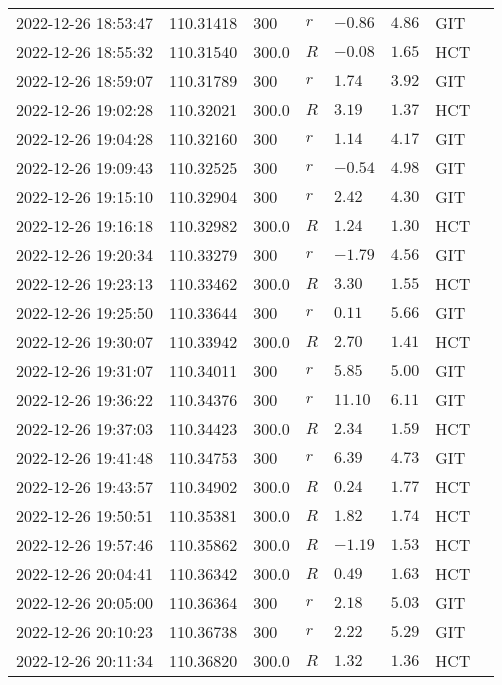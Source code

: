 \documentclass{nature_plusfigure}
\begin{document}
\begin{supplement}
\begin{center}
\begin{longtable}{llllllll}
2022-12-26 18:53:47 & 110.31418 & 300 & $r$ & $-0.86$ & $4.86$ & GIT &  \\ 
2022-12-26 18:55:32 & 110.31540 & 300.0 & $R$ & $-0.08$ & $1.65$ & HCT &  \\ 
2022-12-26 18:59:07 & 110.31789 & 300 & $r$ & $1.74$ & $3.92$ & GIT &  \\ 
2022-12-26 19:02:28 & 110.32021 & 300.0 & $R$ & $3.19$ & $1.37$ & HCT &  \\ 
2022-12-26 19:04:28 & 110.32160 & 300 & $r$ & $1.14$ & $4.17$ & GIT &  \\ 
2022-12-26 19:09:43 & 110.32525 & 300 & $r$ & $-0.54$ & $4.98$ & GIT &  \\ 
2022-12-26 19:15:10 & 110.32904 & 300 & $r$ & $2.42$ & $4.30$ & GIT &  \\ 
2022-12-26 19:16:18 & 110.32982 & 300.0 & $R$ & $1.24$ & $1.30$ & HCT &  \\ 
2022-12-26 19:20:34 & 110.33279 & 300 & $r$ & $-1.79$ & $4.56$ & GIT &  \\ 
2022-12-26 19:23:13 & 110.33462 & 300.0 & $R$ & $3.30$ & $1.55$ & HCT &  \\ 
2022-12-26 19:25:50 & 110.33644 & 300 & $r$ & $0.11$ & $5.66$ & GIT &  \\ 
2022-12-26 19:30:07 & 110.33942 & 300.0 & $R$ & $2.70$ & $1.41$ & HCT &  \\ 
2022-12-26 19:31:07 & 110.34011 & 300 & $r$ & $5.85$ & $5.00$ & GIT &  \\ 
2022-12-26 19:36:22 & 110.34376 & 300 & $r$ & $11.10$ & $6.11$ & GIT &  \\ 
2022-12-26 19:37:03 & 110.34423 & 300.0 & $R$ & $2.34$ & $1.59$ & HCT &  \\ 
2022-12-26 19:41:48 & 110.34753 & 300 & $r$ & $6.39$ & $4.73$ & GIT &  \\ 
2022-12-26 19:43:57 & 110.34902 & 300.0 & $R$ & $0.24$ & $1.77$ & HCT &  \\ 
2022-12-26 19:50:51 & 110.35381 & 300.0 & $R$ & $1.82$ & $1.74$ & HCT &  \\ 
2022-12-26 19:57:46 & 110.35862 & 300.0 & $R$ & $-1.19$ & $1.53$ & HCT &  \\ 
2022-12-26 20:04:41 & 110.36342 & 300.0 & $R$ & $0.49$ & $1.63$ & HCT &  \\ 
2022-12-26 20:05:00 & 110.36364 & 300 & $r$ & $2.18$ & $5.03$ & GIT &  \\ 
2022-12-26 20:10:23 & 110.36738 & 300 & $r$ & $2.22$ & $5.29$ & GIT &  \\ 
2022-12-26 20:11:34 & 110.36820 & 300.0 & $R$ & $1.32$ & $1.36$ & HCT &  \\ 

\end{longtable}
\end{center}
\end{supplement}
\end{document}
